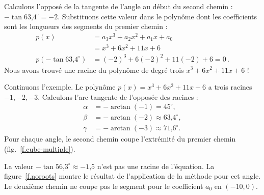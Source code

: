 Calculons l'opposé de la tangente de l'angle au début du second chemin : $-\tan \mbox{63,4}^\circ=-2$. Substituons cette valeur dans le polynôme dont les coefficients sont les longueurs des segments du premier chemin :
\begin{align*}
p(x)&=a_3x^3+a_2x^2+a_1x+a_0\\
&=x^3+6x^2+11x+6\\
p(-\tan \mbox{63,4}^\circ)&=(-2)^3+6(-2)^2+11(-2)+6=0\,.
\end{align*}
Nous avons trouvé une racine du polynôme de degré trois  $x^3+6x^2+11x+6$ !


Continuons l'exemple. Le polynôme $p(x)=x^3+6x^2+11x+6$ a trois racines $-1,-2,-3$. Calculons l'arc tangente de l'opposée des racines :
\begin{align*}
\alpha&=-\arctan (-1) = 45^\circ,\\
\beta&=-\arctan(-2) \approx \mbox{63,4}^\circ,\\
\gamma&=-\arctan(-3)\approx \mbox{71,6}^\circ.
\end{align*}
Pour chaque angle, le second chemin coupe l'extrémité du premier chemin (fig.~\ref{f.cube-multiple}).


La valeur $-\tan \mbox{56,3}^\circ\approx -\mbox{1,5}$ n'est pas une racine de l'équation. La figure~\ref{f.noroots} montre le résultat de l'application de la méthode pour cet angle. Le deuxième chemin ne coupe pas le segment  pour le coefficient $a_0$ en $(-10,0)$.

